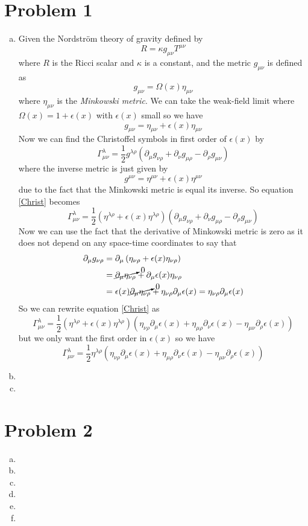 \documentclass[11pt]{article}
\numberwithin{equation}{section}
\begin{document}


\section{Problem 1}
\begin{enumerate}[(a)]
\item
Given the Nordstr\"{o}m theory of gravity defined by
$$R = \kappa g_{\mu\nu}T^{\mu\nu}$$
where $R$ is the Ricci scalar and $\kappa$ is a constant, and the metric $g_{\mu\nu}$ is defined as
\begin{equation}
g_{\mu\nu} = \Omega(x)\eta_{\mu\nu}
\label{Prob1Metric}
\end{equation}
where $\eta_{\mu\nu}$ is the \emph{Minkowski metric}. We can take the weak-field limit where $\Omega(x) = 1+\epsilon(x)$ with $\epsilon(x)$ small so we have
$$g_{\mu\nu} = \eta_{\mu\nu} + \epsilon(x)\eta_{\mu\nu}$$
Now we can find the Christoffel symbols in first order of $\epsilon(x)$ by
\begin{equation}
\Gamma^{\lambda}_{\mu\nu} = \frac{1}{2}g^{\lambda\rho}\left(\partial_{\mu}g_{\nu\rho}+\partial_{\nu}g_{\mu\rho} - \partial_{\rho}g_{\mu\nu}\right)
\label{Christ}
\end{equation}
where the inverse metric is just given by
$$g^{\mu\nu} = \eta^{\mu\nu} + \epsilon(x)\eta^{\mu\nu}$$
due to the fact that the Minkowski metric is equal its inverse. So equation \ref{Christ} becomes
$$\Gamma^{\lambda}_{\mu\nu} = \frac{1}{2}\left(\eta^{\lambda\rho}+\epsilon(x)\eta^{\lambda\rho}\right)\left(\partial_{\mu}g_{\nu\rho}+\partial_{\nu}g_{\mu\rho} - \partial_{\rho}g_{\mu\nu}\right)$$
Now we can use the fact that the derivative of Minkowski metric is zero as it does not depend on any space-time coordinates to say that
\begin{align*}
\partial_{\mu}g_{\nu\rho} &= \partial_{\mu}\left(\eta_{\nu\rho} + \epsilon(x)\eta_{\nu\rho}\right)\\
&= \cancelto{0}{\partial_{\mu}\eta_{\nu\rho}} + \partial_{\mu}\epsilon(x)\eta_{\nu\rho}\\
&= \epsilon(x)\cancelto{0}{\partial_{\mu}\eta_{\nu\rho}} + \eta_{\nu\rho}\partial_{\mu}\epsilon(x) = \eta_{\nu\rho}\partial_{\mu}\epsilon(x) 
\end{align*}
So we can rewrite equation \ref{Christ} as
$$\Gamma^{\lambda}_{\mu\nu} = \frac{1}{2}\left(\eta^{\lambda\rho}+\epsilon(x)\eta^{\lambda\rho}\right)\left(\eta_{\nu\rho}\partial_{\mu}\epsilon(x)+\eta_{\mu\rho}\partial_{\nu}\epsilon(x) - \eta_{\mu\nu}\partial_{\rho}\epsilon(x)\right)$$
but we only want the first order in $\epsilon(x)$ so we have
$$\Gamma^{\lambda}_{\mu\nu} = \frac{1}{2}\eta^{\lambda\rho}\left(\eta_{\nu\rho}\partial_{\mu}\epsilon(x)+\eta_{\mu\rho}\partial_{\nu}\epsilon(x) - \eta_{\mu\nu}\partial_{\rho}\epsilon(x)\right)$$


\item
\item
\end{enumerate}

\section{Problem 2}
\begin{enumerate}[(a)]
\item
\item
\item
\item
\item
\item
\end{enumerate}
\end{document}
